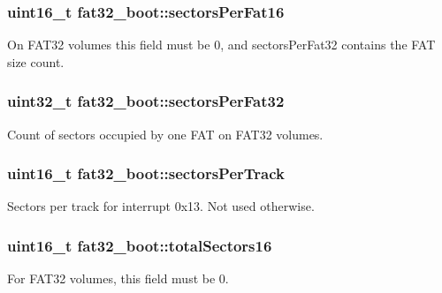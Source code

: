 \subsubsection[{\texorpdfstring{sectors\+Per\+Fat16}{sectorsPerFat16}}]{\setlength{\rightskip}{0pt plus 5cm}uint16\+\_\+t fat32\+\_\+boot\+::sectors\+Per\+Fat16}\hypertarget{structfat32__boot_aeaa78272cd42b162ea448e1642f75cab}{}\label{structfat32__boot_aeaa78272cd42b162ea448e1642f75cab}
On F\+A\+T32 volumes this field must be 0, and sectors\+Per\+Fat32 contains the F\+AT size count. 
\subsubsection[{\texorpdfstring{sectors\+Per\+Fat32}{sectorsPerFat32}}]{\setlength{\rightskip}{0pt plus 5cm}uint32\+\_\+t fat32\+\_\+boot\+::sectors\+Per\+Fat32}\hypertarget{structfat32__boot_aa00db084ff2f7e25febef321469adeb9}{}\label{structfat32__boot_aa00db084ff2f7e25febef321469adeb9}
Count of sectors occupied by one F\+AT on F\+A\+T32 volumes. 
\subsubsection[{\texorpdfstring{sectors\+Per\+Track}{sectorsPerTrack}}]{\setlength{\rightskip}{0pt plus 5cm}uint16\+\_\+t fat32\+\_\+boot\+::sectors\+Per\+Track}\hypertarget{structfat32__boot_a9525b2e63f84a5cf62ea20199cedf5de}{}\label{structfat32__boot_a9525b2e63f84a5cf62ea20199cedf5de}
Sectors per track for interrupt 0x13. Not used otherwise. 
\subsubsection[{\texorpdfstring{total\+Sectors16}{totalSectors16}}]{\setlength{\rightskip}{0pt plus 5cm}uint16\+\_\+t fat32\+\_\+boot\+::total\+Sectors16}\hypertarget{structfat32__boot_acbcae2f15475a886f674f932da1deb3f}{}\label{structfat32__boot_acbcae2f15475a886f674f932da1deb3f}
For F\+A\+T32 volumes, this field must be 0. 
